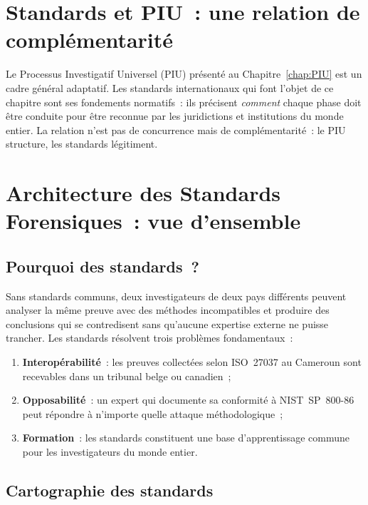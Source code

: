 \section*{Standards et PIU~: une relation de complémentarité}

Le Processus Investigatif Universel (PIU) présenté au Chapitre~\ref{chap:PIU}
est un cadre général adaptatif. Les standards internationaux qui font l'objet
de ce chapitre sont ses fondements normatifs~: ils précisent \emph{comment}
chaque phase doit être conduite pour être reconnue par les juridictions et
institutions du monde entier. La relation n'est pas de concurrence mais de
complémentarité~: le PIU structure, les standards légitiment.

\separateur

\section{Architecture des Standards Forensiques~: vue d'ensemble}
\label{sec:std-architecture}

\subsection{Pourquoi des standards~?}

Sans standards communs, deux investigateurs de deux pays différents peuvent
analyser la même preuve avec des méthodes incompatibles et produire des
conclusions qui se contredisent sans qu'aucune expertise externe ne puisse
trancher. Les standards résolvent trois problèmes fondamentaux~:
\begin{enumerate}
    \item \textbf{Interopérabilité}~: les preuves collectées selon ISO~27037
          au Cameroun sont recevables dans un tribunal belge ou canadien~;
    \item \textbf{Opposabilité}~: un expert qui documente sa conformité à
          NIST~SP~800-86 peut répondre à n'importe quelle attaque méthodologique~;
    \item \textbf{Formation}~: les standards constituent une base d'apprentissage
          commune pour les investigateurs du monde entier.
\end{enumerate}

\subsection{Cartographie des standards}

